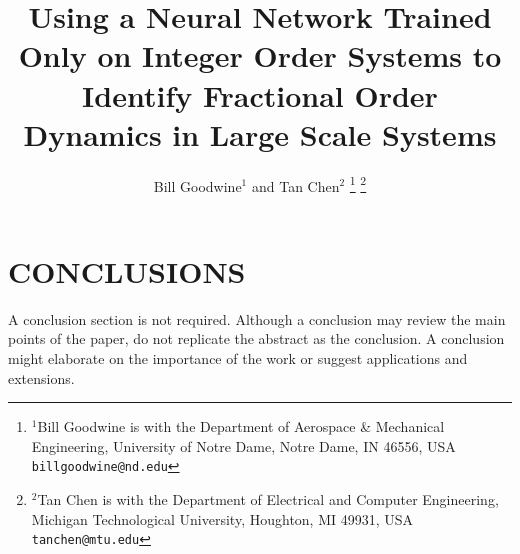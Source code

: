 \documentclass[letterpaper, 10 pt, conference]{ieeeconf}  %
\title{\LARGE \bf
Using a Neural Network Trained Only on Integer Order Systems to Identify
Fractional Order Dynamics in Large Scale Systems}
\author{Bill Goodwine$^{1}$ and Tan Chen$^{2}$%
\thanks{$^{1}$Bill Goodwine is with the Department of Aerospace \& Mechanical
  Engineering, University of Notre Dame, Notre Dame, IN 46556, USA
{\tt\small billgoodwine@nd.edu}}%
\thanks{$^{2}$Tan Chen is with the Department of Electrical and Computer
Engineering, Michigan Technological University, Houghton, MI 49931, USA
{\tt\small tanchen@mtu.edu}}
}
\begin{document}
\maketitle
\thispagestyle{empty}
\pagestyle{empty}








\section{CONCLUSIONS}
\label{sec:conclusions}

A conclusion section is not required. Although a conclusion may review the main
points of the paper, do not replicate the abstract as the conclusion. A
conclusion might elaborate on the importance of the work or suggest applications
and extensions. 




\end{document}

